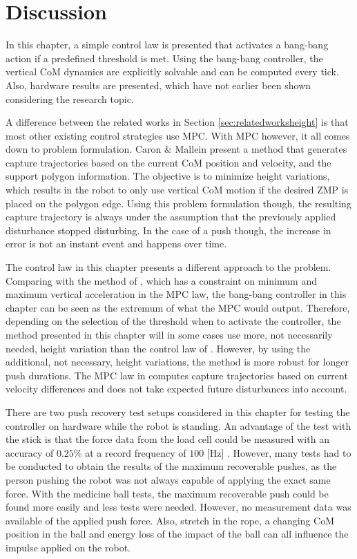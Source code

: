 \section{Discussion}
In this chapter, a simple control law is presented that activates a bang-bang action if a predefined threshold is met. Using the bang-bang controller, the vertical \ac{CoM} dynamics are explicitly solvable and can be computed every tick. Also, hardware results are presented, which have not earlier been shown considering the research topic. 

A difference between the related works in Section \ref{sec:relatedworksheight} is that most other existing control strategies use \ac{MPC}. With \ac{MPC} however, it all comes down to problem formulation. Caron \& Mallein \cite{caron2018balance} present a method that generates capture trajectories based on the current \ac{CoM} position and velocity, and the support polygon information. The objective is to minimize height variations, which results in the robot to only use vertical \ac{CoM} motion if the desired \ac{ZMP} is placed on the polygon edge. Using this problem formulation though, the resulting capture trajectory is always under the assumption that the previously applied disturbance stopped disturbing. In the case of a push though, the increase in error is not an instant event and happens over time.

The control law in this chapter presents a different approach to the problem. Comparing with the method of \cite{caron2018balance}, which has a constraint on minimum and maximum vertical acceleration in the \ac{MPC} law, the bang-bang controller in this chapter can be seen as the extremum of what the \ac{MPC} would output. Therefore, depending on the selection of the threshold when to activate the controller, the method presented in this chapter will in some cases use more, not necessarily needed, height variation than the control law of \cite{caron2018balance}. However, by using the additional, not necessary, height variations, the method is more robust for longer push durations. The \ac{MPC} law in \cite{caron2018balance} computes capture trajectories based on current velocity differences and does not take expected future disturbances into account.

There are two push recovery test setups considered in this chapter for testing the controller on hardware while the robot is standing. An advantage of the test with the stick is that the force data from the load cell could be measured with an accuracy of $0.25$\% at a record frequency of $100$ [Hz] \cite{iload}. However, many tests had to be conducted to obtain the results of the maximum recoverable pushes, as the person pushing the robot was not always capable of applying the exact same force. With the medicine ball tests, the maximum recoverable push could be found more easily and less tests were needed. However, no measurement data was available of the applied push force. Also, stretch in the rope, a changing \ac{CoM} position in the ball and energy loss of the impact of the ball can all influence the impulse applied on the robot.

